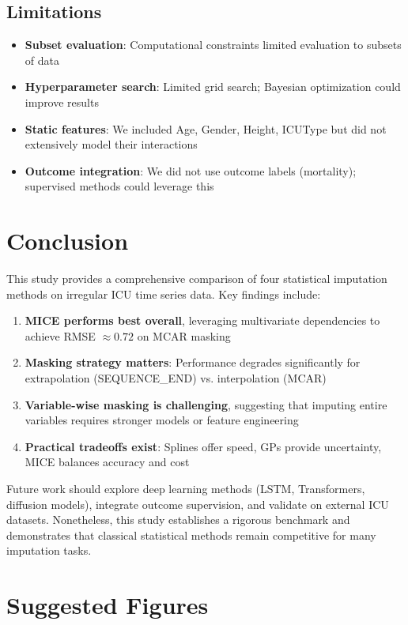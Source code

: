 \documentclass[11pt]{article}
\begin{document}
\subsection{Limitations}
\begin{itemize}[noitemsep]
    \item \textbf{Subset evaluation}: Computational constraints limited evaluation to subsets of data
    \item \textbf{Hyperparameter search}: Limited grid search; Bayesian optimization could improve results
    \item \textbf{Static features}: We included Age, Gender, Height, ICUType but did not extensively model their interactions
    \item \textbf{Outcome integration}: We did not use outcome labels (mortality); supervised methods could leverage this
\end{itemize}

\section{Conclusion}

This study provides a comprehensive comparison of four statistical imputation methods on irregular ICU time series data. Key findings include:
\begin{enumerate}[noitemsep]
    \item \textbf{MICE performs best overall}, leveraging multivariate dependencies to achieve RMSE $\approx 0.72$ on MCAR masking
    \item \textbf{Masking strategy matters}: Performance degrades significantly for extrapolation (SEQUENCE\_END) vs. interpolation (MCAR)
    \item \textbf{Variable-wise masking is challenging}, suggesting that imputing entire variables requires stronger models or feature engineering
    \item \textbf{Practical tradeoffs exist}: Splines offer speed, GPs provide uncertainty, MICE balances accuracy and cost
\end{enumerate}

Future work should explore deep learning methods (LSTM, Transformers, diffusion models), integrate outcome supervision, and validate on external ICU datasets. Nonetheless, this study establishes a rigorous benchmark and demonstrates that classical statistical methods remain competitive for many imputation tasks.

\section{Suggested Figures}
\end{document}
